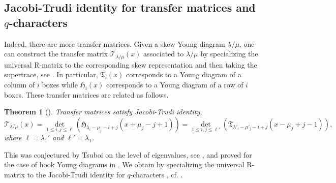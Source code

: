 \documentclass[11pt,reqno]{amsart}
\numberwithin{equation}{section}
\newtheorem{thm}{Theorem}[section]
\theoremstyle{definition}
\theoremstyle{remark}
\newcommand{\fkT}{\mathfrak{T}}
\newcommand{\lle}{\leqslant}
\newcommand{\la}{\lambda}
\begin{document}
\subsection{Jacobi-Trudi identity for transfer matrices and $q$-characters}
Indeed, there are more transfer matrices. Given a skew Young diagram $\la/\mu$, one can construct the transfer matrix $\mathscr T_{\la/\mu}(x)$ associated to $\la/\mu$ by specializing the universal R-matrix to the corresponding skew representation \cite[Sec. 3]{LM:2020} and then taking the supertrace, see \cite[Sec. 5]{LM:2020}. In particular, $\fkT_i(x)$ corresponds to a Young diagram of a column of $i$ boxes while $\mathfrak H_i(x)$ corresponds to a Young diagram of a row of $i$ boxes. These transfer matrices are related as follows.

\begin{thm}[{\cite[Theorem 5.3]{LM:2020}}]
Transfer matrices satisfy Jacobi-Trudi identity,
$$
\mathscr T_{\la/\mu}(x)=\det_{1\lle i,j\lle \ell}(\mathfrak H_{\la_i-\mu_j-i+j}(x+\mu_j-j+1))=\det_{1\lle i,j\lle \ell'}(\fkT_{\la'_i-\mu'_j-i+j}(x-\mu_j+j-1)),
$$
where $\ell=\la_1'$ and $\ell'=\la_1$.
\end{thm}
This was conjectured by Tsuboi on the level of eigenvalues, see \cite{Tsu:1997}, and proved for the case of hook Young diagrams in \cite{KV:2008}. We obtain by specializing the universal R-matrix to the Jacobi-Trudi identity for $q$-characters \cite[Theorem 3.16]{LM:2020}, cf. \cite[Conjecture 2.2]{NN:2006}.
\end{document}
